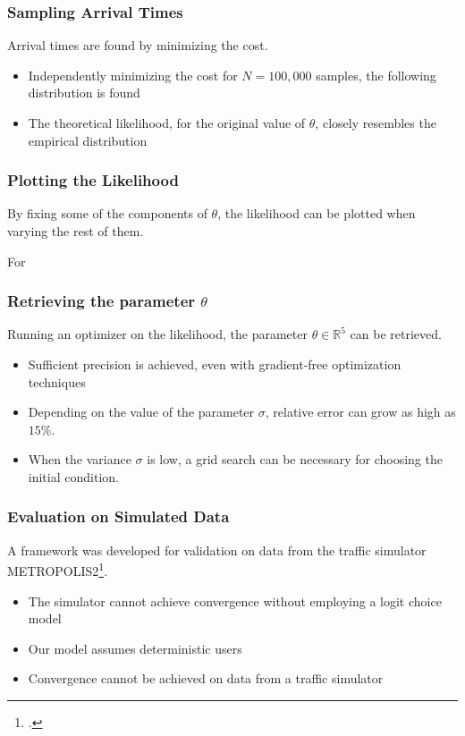 \documentclass[hyperref={pdfpagelabels=false}]{beamer}
\begin{document}
\begin{frame}
  \frametitle{Sampling Arrival Times}
  Arrival times are found by minimizing the cost.
  \begin{itemize}
  \item Independently minimizing the cost for \(N = 100,000\) samples, the following distribution is found
  \item<2-> The theoretical likelihood, for the original value of \(\theta\), closely resembles the empirical distribution
  \end{itemize}
  \centering
\end{frame}

\begin{frame}
  \frametitle{Plotting the Likelihood}
  By fixing some of the components of \(\theta\), the likelihood can be plotted when varying the rest of them.

  For 

  \centering
\end{frame}

\begin{frame}
  \frametitle{Retrieving the parameter \(\theta\)}
  Running an optimizer on the likelihood,
  the parameter \(\theta \in \mathbb{R}^5\) can be retrieved.
  \begin{itemize}
  \item<2-> Sufficient precision is achieved, even with gradient-free optimization techniques
  \item<3-> Depending on the value of the parameter \(\sigma\),
    relative error can grow as high as \(15\%\).
  \item<4-> When the variance \(\sigma\) is low, a grid search can be necessary for choosing the initial condition.
  \end{itemize}
\end{frame}

\begin{frame}
  \frametitle{Evaluation on Simulated Data}
  A framework was developed for validation on data from the traffic simulator METROPOLIS2\footcite{RePEc:ema:worpap:2024-03}.
  \begin{itemize}
  \item<2-> The simulator cannot achieve convergence without employing a logit choice model
  \item<2-> Our model assumes deterministic users
  \item<3-> Convergence cannot be achieved on data from a traffic simulator
  \end{itemize}
\end{frame}
\end{document}
